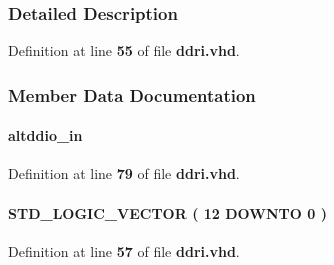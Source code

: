 \subsubsection{Detailed Description}


Definition at line {\bf 55} of file {\bf ddri.\+vhd}.



\subsubsection{Member Data Documentation}
\paragraph[{altddio\+\_\+in\+\_\+component}]{ {\bfseries \textcolor{vhdlchar}{altddio\+\_\+in}\textcolor{vhdlchar}{ }} \hspace{0.3cm}{\ttfamily [Instantiation]}}\label{classddri_1_1SYN_a1028169cb9a3c4b1883e921d0b505fbb}


Definition at line {\bf 79} of file {\bf ddri.\+vhd}.

\paragraph[{sub\+\_\+wire0}]{ {\bfseries \textcolor{comment}{S\+T\+D\+\_\+\+L\+O\+G\+I\+C\+\_\+\+V\+E\+C\+T\+OR}\textcolor{vhdlchar}{ }\textcolor{vhdlchar}{(}\textcolor{vhdlchar}{ }\textcolor{vhdlchar}{ } \textcolor{vhdldigit}{12} \textcolor{vhdlchar}{ }\textcolor{keywordflow}{D\+O\+W\+N\+TO}\textcolor{vhdlchar}{ }\textcolor{vhdlchar}{ } \textcolor{vhdldigit}{0} \textcolor{vhdlchar}{ }\textcolor{vhdlchar}{)}\textcolor{vhdlchar}{ }} \hspace{0.3cm}{\ttfamily [Signal]}}\label{classddri_1_1SYN_a568529a9643547f2c969a1c28ef66810}


Definition at line {\bf 57} of file {\bf ddri.\+vhd}.

